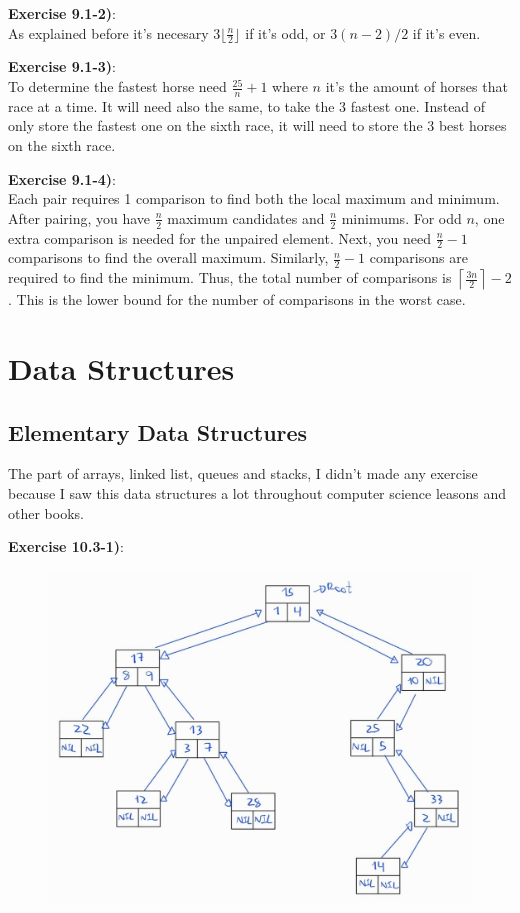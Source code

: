 \documentclass{article}
\newcounter{exercise}[section]   %
\begin{document}
\textbf{Exercise 9.1-2)}:\\
As explained before it's necesary \(3\lfloor\frac{n}{2}\rfloor\) if it's odd, or \(3(n-2)/2\)
if it's even.

\textbf{Exercise 9.1-3)}:\\
To determine the fastest horse need \(\frac{25}{n} + 1\) where \(n\) it's the amount of horses
that race at a time. It will need also the same, to take the 3 fastest one. Instead of only
store the fastest one on the sixth race, it will need to store the 3 best horses on the sixth
race.

\textbf{Exercise 9.1-4)}:\\
Each pair requires 1 comparison to find both the local maximum and minimum.  
After pairing, you have \( \frac{n}{2} \) maximum candidates and \( \frac{n}{2} \) minimums.  
For odd \(n\), one extra comparison is needed for the unpaired element.  
Next, you need \( \frac{n}{2} - 1 \) comparisons to find the overall maximum.  
Similarly, \( \frac{n}{2} - 1 \) comparisons are required to find the minimum.  
Thus, the total number of comparisons is \( \left\lceil \frac{3n}{2} \right\rceil - 2 \).  
This is the lower bound for the number of comparisons in the worst case.

\section{Data Structures}

\subsection{Elementary Data Structures}
The part of arrays, linked list, queues and stacks, I didn't made any exercise because I
saw this data structures a lot throughout computer science leasons and other books.
\setcounter{exercise}{0}


\newpage
{}
\textbf{Exercise 10.3-1)}:
\begin{figure}[h]
    \includegraphics[scale=0.3]{Problem10_3_1.jpeg}
    \centering
\end{figure}
\end{document}
